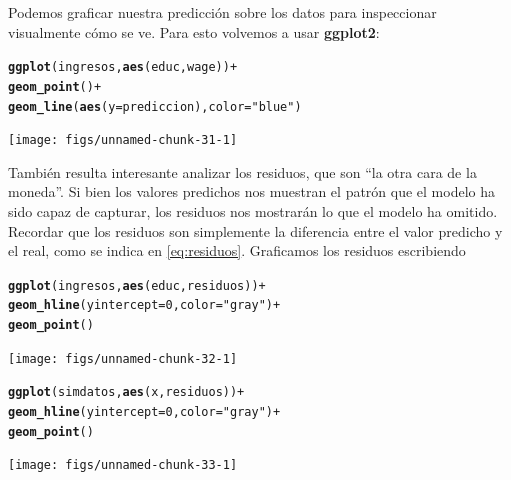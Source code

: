 \documentclass[12pt]{report}\usepackage[]{graphicx}\usepackage[]{color}
\makeatletter
\newcommand{\hlnum}[1]{\textcolor[rgb]{0.686,0.059,0.569}{#1}}%
\newcommand{\hlstr}[1]{\textcolor[rgb]{0.192,0.494,0.8}{#1}}%
\newcommand{\hlopt}[1]{\textcolor[rgb]{0,0,0}{#1}}%
\newcommand{\hlstd}[1]{\textcolor[rgb]{0.345,0.345,0.345}{#1}}%
\newcommand{\hlkwc}[1]{\textcolor[rgb]{0.333,0.667,0.333}{#1}}%
\newcommand{\hlkwd}[1]{\textcolor[rgb]{0.737,0.353,0.396}{\textbf{#1}}}%
\newenvironment{kframe}{%
 \def\at@end@of@kframe{}%
 \ifinner\ifhmode%
  \def\at@end@of@kframe{\end{minipage}}%
  \begin{minipage}{\columnwidth}%
 \fi\fi%
 \def\FrameCommand##1{\hskip\@totalleftmargin \hskip-\fboxsep
 \colorbox{shadecolor}{##1}\hskip-\fboxsep
     \hskip-\linewidth \hskip-\@totalleftmargin \hskip\columnwidth}%
 \MakeFramed {\advance\hsize-\width
   \@totalleftmargin\z@ \linewidth\hsize
   \@setminipage}}%
 {\par\unskip\endMakeFramed%
 \at@end@of@kframe}
\newenvironment{knitrout}{}{} %
\newcommand*{\paq}[1]{\textbf{#1}\index{#1@\textbf{#1}}}
\makeatother
\begin{document}
Podemos graficar nuestra predicción sobre los datos para inspeccionar visualmente cómo se ve. Para esto volvemos a usar \paq{ggplot2}:
\begin{knitrout}
\color{fgcolor}\begin{kframe}
\begin{alltt}
\hlkwd{ggplot}\hlstd{(ingresos,} \hlkwd{aes}\hlstd{(educ, wage))} \hlopt{+}
  \hlkwd{geom_point}\hlstd{()} \hlopt{+}
  \hlkwd{geom_line}\hlstd{(}\hlkwd{aes}\hlstd{(}\hlkwc{y} \hlstd{= prediccion),} \hlkwc{color} \hlstd{=} \hlstr{"blue"}\hlstd{)}
\end{alltt}
\end{kframe}

{\centering \texttt{[image: figs/unnamed-chunk-31-1]} 

}



\end{knitrout}

También resulta interesante analizar los residuos, que son ``la otra cara de la moneda''. Si bien los valores predichos nos muestran el patrón que el modelo ha sido capaz de capturar, los residuos nos mostrarán lo que el modelo ha omitido. Recordar que los residuos son simplemente la diferencia entre el valor predicho y el real, como se indica en \eqref{eq:residuos}. Graficamos los residuos escribiendo

\begin{knitrout}
\color{fgcolor}\begin{kframe}
\begin{alltt}
\hlkwd{ggplot}\hlstd{(ingresos,} \hlkwd{aes}\hlstd{(educ, residuos))} \hlopt{+}
  \hlkwd{geom_hline}\hlstd{(}\hlkwc{yintercept} \hlstd{=} \hlnum{0}\hlstd{,} \hlkwc{color} \hlstd{=} \hlstr{"gray"}\hlstd{)} \hlopt{+}
  \hlkwd{geom_point}\hlstd{()}
\end{alltt}
\end{kframe}

{\centering \texttt{[image: figs/unnamed-chunk-32-1]} 

}



\end{knitrout}

\begin{knitrout}
\color{fgcolor}\begin{kframe}
\begin{alltt}
\hlkwd{ggplot}\hlstd{(simdatos,} \hlkwd{aes}\hlstd{(x, residuos))} \hlopt{+}
  \hlkwd{geom_hline}\hlstd{(}\hlkwc{yintercept} \hlstd{=} \hlnum{0}\hlstd{,} \hlkwc{color} \hlstd{=} \hlstr{"gray"}\hlstd{)} \hlopt{+}
  \hlkwd{geom_point}\hlstd{()}
\end{alltt}
\end{kframe}

{\centering \texttt{[image: figs/unnamed-chunk-33-1]} 

}



\end{knitrout}
\end{document}
